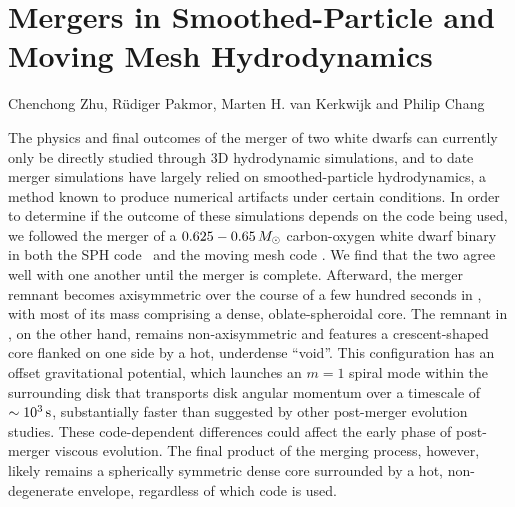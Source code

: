 \chapter{Mergers in Smoothed-Particle and Moving Mesh Hydrodynamics}
\label{ch:ch3}

\begin{center}
\begin{minipage}[c]{4.75in}
Chenchong Zhu, R\"{u}diger Pakmor, Marten H. van Kerkwijk and Philip Chang\\
\vspace{2em}
\end{minipage}
\end{center}

The physics and final outcomes of the merger of two white dwarfs can currently only be directly studied through 3D hydrodynamic simulations, and to date merger simulations have largely relied on smoothed-particle hydrodynamics, a method known to produce numerical artifacts under certain conditions.  In order to determine if the outcome of these simulations depends on the code being used, we followed the merger of a $0.625 - 0.65\,\Msun$ carbon-oxygen white dwarf binary in both the SPH code \gasoline\ and the moving mesh code \arepo.  We find that the two agree well with one another until the merger is complete.  Afterward, the merger remnant becomes axisymmetric over the course of a few hundred seconds in \gasoline, with most of its mass comprising a dense, oblate-spheroidal core.  The remnant in \arepo, on the other hand, remains non-axisymmetric and features a crescent-shaped core flanked on one side by a hot, underdense ``void''.  This configuration has an offset gravitational potential, which launches an $m = 1$ spiral mode within the surrounding disk that transports disk angular momentum over a timescale of $\sim10^3\,\mathrm{s}$, substantially faster than suggested by other post-merger evolution studies.  These code-dependent differences could affect the early phase of post-merger viscous evolution.  The final product of the merging process, however, likely remains a spherically symmetric dense core surrounded by a hot, non-degenerate envelope, regardless of which code is used.

